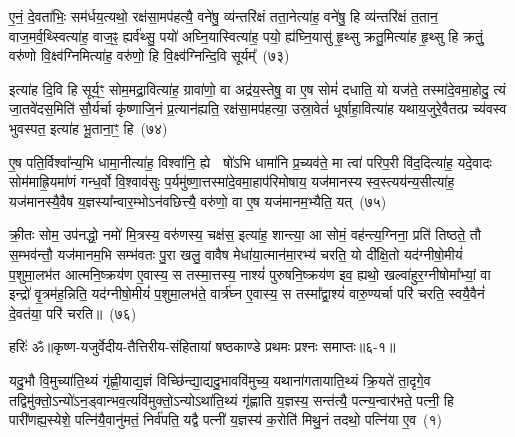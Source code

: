 ए॒नं॒ दे॒वता॑भिः॒ सम॑र्धय॒त्यथो॒ रक्ष॑सा॒मप॑हत्यै॒ वने॑षु॒ व्य॑न्तरि॑क्षं तता॒नेत्या॑ह॒ वने॑षु॒ हि व्य॑न्तरि॑क्षं त॒तान॒ वाज॒मर्व॒थ्स्वित्या॑ह॒ वाज॒ꣴ॒ ह्यर्व॑थ्सु॒ पयो॑ अघ्नि॒यास्वित्या॑ह॒ पयो॒ ह्य॑घ्नि॒यासु॑ हृ॒थ्सु क्रतु॒मित्या॑ह हृ॒थ्सु हि क्रतुं॒ वरु॑णो वि॒क्ष्व॑ग्निमित्या॑ह॒ वरु॑णो॒ हि वि॒क्ष्व॑ग्निन्दि॒वि सूर्यम्᳚~(७३)

इत्या॑ह दि॒वि हि सूर्य॒ꣳ॒ सोम॒मद्रा॒वित्या॑ह॒ ग्रावा॑णो॒ वा अद्र॑य॒स्तेषु॒ वा ए॒ष सोमं॑ दधाति॒ यो यज॑ते॒ तस्मा॑दे॒वमा॒होदु॒ त्यं जा॒तवे॑दस॒मिति॑ सौ॒र्यर्चा कृ॑ष्णाजि॒नं प्र॒त्यान॑ह्यति॒ रक्ष॑सा॒मप॑हत्या॒ उस्रा॒वेतं॑ धूर्\mbox{}षाहा॒वित्या॑ह यथाय॒जुरे॒वैतत्प्र च्य॑वस्व भुवस्पत॒ इत्या॑ह भू॒ताना॒ꣳ॒ हि~(७४)

ए॒ष पति॒र्विश्वा᳚न्य॒भि धामा॒नीत्या॑ह॒ विश्वा॑नि॒ ह्ये  षो॑\-ऽभि धामा॑नि प्र॒च्यव॑ते॒ मा त्वा॑ परिप॒री वि॑द॒दित्या॑ह॒ यदे॒वादः सोम॑माह्रि॒यमा॑णं गन्ध॒र्वो वि॒श्वाव॑सुः प॒र्यमु॑ष्णा॒त्तस्मा॑दे॒वमा॒हाप॑रिमोषाय॒ यज॑मानस्य स्व॒स्त्यय॑न्य॒सीत्या॑ह॒ यज॑मानस्यै॒वैष य॒ज्ञस्या᳚न्वार॒म्भो\-ऽन॑वछित्त्यै॒ वरु॑णो॒ वा ए॒ष यज॑मानम॒भ्यैति॒ यत्~(७५)

क्री॒तः सोम॒ उप॑नद्धो॒ नमो॑ मि॒त्रस्य॒ वरु॑णस्य॒ चक्ष॑स॒ इत्या॑ह॒ शान्त्या॒ आ सोमं॒ वह॑न्त्य॒ग्निना॒ प्रति॑ तिष्ठते॒ तौ स॒म्भव॑न्तौ॒ यज॑मानम॒भि सम्भ॑वतः पु॒रा खलु॒ वावैष मेधा॑या॒त्मान॑मा॒रभ्य॑ चरति॒ यो दी᳚क्षि॒तो यद॑ग्नीषो॒मीयं॑ प॒शुमा॒लभ॑त आत्मनि॒ष्क्रय॑ण ए॒वास्य॒ स तस्मा॒त्तस्य॒ नाश्यं॑ पुरुषनि॒ष्क्रय॑ण इव॒ ह्यथो॒ खल्वा॑हुर॒ग्नी\-षोमा᳚भ्यां॒ वा इन्द्रो॑ वृ॒त्रम॑ह॒न्निति॒ यद॑ग्नीषो॒मीयं॑ प॒शुमा॒लभ॑ते॒ वार्त्र॑घ्न ए॒वास्य॒ स तस्मा᳚द्वा॒श्यं॑ वारु॒ण्यर्चा परि॑ चरति॒ स्वयै॒वैनं॑ दे॒वत॑या॒ परि॑ चरति॥~(७६)

{\anuvakamend[{अ॒न्वा॒रभ्योथ्सर्वा॑भिरे॒व सूर्यं॑ भू॒ताना॒ꣴ॒ ह्ये॑ति॒ यदा॑हुः स॒प्तविꣳ॑शतिश्च}]}%

{हरिः॑ ॐ}{॥कृष्ण-यजुर्वेदीय-तैत्तिरीय-संहितायां षष्ठकाण्डे प्रथमः प्रश्नः समाप्तः॥६-१॥}

\setcounter{anuvakam}{0}
यदु॒भौ वि॒मुच्या॑ति॒थ्यं गृ॑ह्णी॒याद्य॒ज्ञं विच्छि॑न्द्या॒द्यदु॒भाववि॑मुच्य॒ यथाना॑गतायाति॒थ्यं क्रि॒यते॑ ता॒दृगे॒व तद्विमु॑क्तो॒\-ऽन्यो॑\-ऽन॒ड्वान्भव॒त्यवि॑मुक्तो॒\-ऽन्यो\-ऽथा॑ति॒थ्यं गृ॑ह्णाति य॒ज्ञस्य॒ सन्त॑त्यै॒ पत्न्य॒न्वार॑भते॒ पत्नी॒ हि पारी॑णह्य॒स्येशे॒ पत्नि॑यै॒वानु॑मतं॒ निर्व॑पति॒ यद्वै पत्नी॑ य॒ज्ञस्य॑ क॒रोति॑ मिथु॒नं तदथो॒ पत्नि॑या ए॒व~(१)

